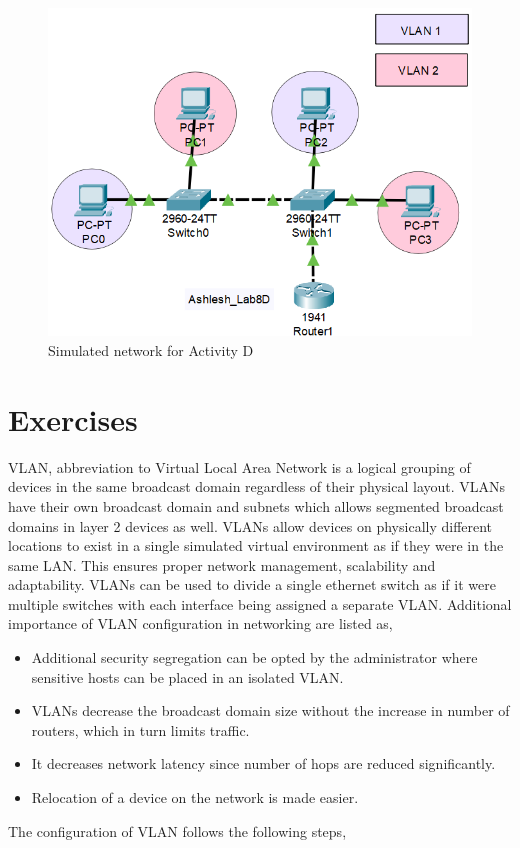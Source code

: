 \documentclass{lab_sheet}
\begin{document}
\begin{figure}[H]
	\centering
	\includegraphics[scale=.9]{Figures/activityd.png}
	\caption{Simulated network for Activity D}
	\label{fig:activityd}
\end{figure}

\section{Exercises}
VLAN, abbreviation to Virtual Local Area Network is a logical grouping of devices in the same broadcast domain regardless of their physical layout. VLANs have their own broadcast domain and subnets which allows segmented broadcast domains in layer 2 devices as well.  VLANs allow devices on physically different locations to exist in a single simulated virtual environment as if they were in the same LAN. This ensures proper network management, scalability and adaptability. VLANs can be used to divide a single ethernet switch as if it were multiple switches with each interface being assigned a separate VLAN. Additional importance of VLAN configuration in networking are listed as,
\begin{itemize}
    \item Additional security segregation can be opted by the administrator where sensitive hosts can be placed in an isolated VLAN.
    \item VLANs decrease the broadcast domain size without the increase in number of routers, which in turn limits traffic.
    \item It decreases network latency since number of hops are reduced significantly.
    \item Relocation of a device on the network is made easier.
\end{itemize}
The configuration of VLAN follows the following steps,
\end{document}
